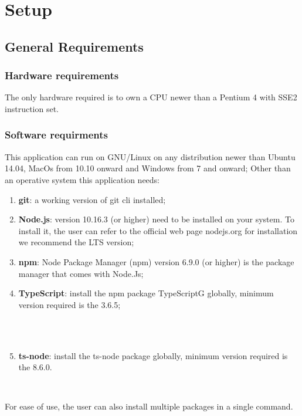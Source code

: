 \section{Setup}
\subsection{General Requirements}
\subsubsection{Hardware requirements}
The only hardware required is to own a CPU newer than a Pentium 4 with SSE2 instruction set.
\subsubsection{Software requirments}
This application can run on GNU/Linux on any distribution newer than Ubuntu 14.04, MacOs from 10.10 onward and Windows from 7 and onward;
Other than an operative system this application needs:
\begin{enumerate}
	\item \textbf{git}: a working version of git cli installed;
    \item \textbf{Node.js}: version 10.16.3 (or higher) need to be installed on your system. To install it, the user can refer to the official web page nodejs.org for installation we recommend the LTS version;
    \item \textbf{npm}: Node Package Manager (npm) version 6.9.0 (or higher) is the package manager that comes with Node.Js;
    \item \textbf{TypeScript}: install the npm package TypeScriptG globally, minimum version required is the 3.6.5;\\\\ \centerline{}\\
    \item \textbf{ts-node}: install the ts-node package globally, minimum version required is the 8.6.0. \newline\newline \centerline{}\\
\end{enumerate}
For ease of use, the user can also install multiple packages in a single command.
\begin{center}
\end{center}
